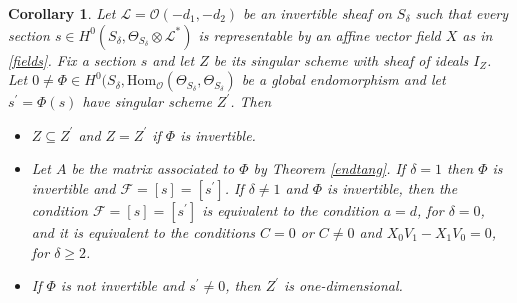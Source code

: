 \documentclass{amsart} %
\newtheorem{corollary}[theorem]{Corollary}
\theoremstyle{definition}
\newcommand{\cts}{\Theta_{S_{\delta}}}
\newcommand{\mcL}{\mathcal{L}}
\newcommand{\mcO}{\mathcal{O}}
\newcommand{\mcF}{\mathcal{F}}
\begin{document}
\begin{corollary}\label{manyfols}
 Let $\mathcal L=\mcO(-d_{1},-d_{2})$ be an invertible sheaf on $S_{\delta}$ such that every section
 $ s \in H^{0}( S_{\delta}, \cts \otimes \mcL^{*}) $ is representable by an affine vector field $ X $
 as in \eqref{fields}. Fix a section $ s $ and let $ Z $ be its singular scheme with sheaf of ideals
 $ I_Z $. Let $0\neq \Phi \in H^0(S_{\delta},\mathrm{Hom}_{ \mcO} (\cts, \cts) $ be a global
 endomorphism and let $ s^{\prime} = \Phi( s ) $ have singular scheme $ Z^{\prime} $. Then
 \begin{itemize}
 \item[(1)] $ Z \subseteq Z^{\prime} $ and $ Z = Z^{\prime} $ if $ \Phi $ is invertible.
 \item[(2)] Let $ A $ be the matrix associated to $ \Phi $ by Theorem \ref{endtang}. If $ \delta = 1 $ then
    $ \Phi $ is invertible and $ \mcF = [s] = [s^{\prime}] $. If $\delta \neq 1$ and $ \Phi$ is invertible, then the condition $ \mcF = [s] = [s^{\prime}] $
    is equivalent to the condition $ a = d $, for $ \delta = 0 $, and it is equivalent to the conditions
    $ C = 0 $ or $ C\neq 0 $ and $ X_0 V_1 - X_1 V_0 = 0 $, for $ \delta \geq 2 $.
  \item[(3)] If $ \Phi $ is not invertible and $ s^{\prime} \neq 0 $, then $ Z^{\prime} $ is one-dimensional.
\end{itemize}
\end{corollary}
\end{document}
